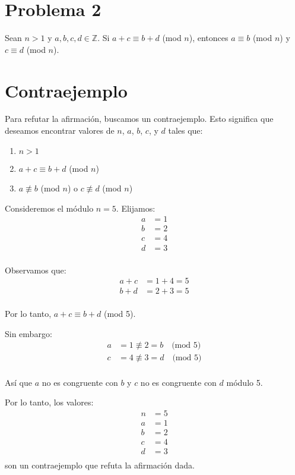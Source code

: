 \documentclass{article}
\begin{document}
\section*{Problema 2}
Sean \( n > 1 \) y \( a, b, c, d \in \mathbb{Z} \). Si \( a+c \equiv b+d \) (mod \( n \)), entonces \( a \equiv b \) (mod \( n \)) y \( c \equiv d \) (mod \( n \)).

\section*{Contraejemplo}

Para refutar la afirmación, buscamos un contraejemplo. Esto significa que deseamos encontrar valores de \( n \), \( a \), \( b \), \( c \), y \( d \) tales que:

\begin{enumerate}
    \item \( n > 1 \)
    \item \( a + c \equiv b + d \) (mod \( n \))
    \item \( a \not\equiv b \) (mod \( n \)) o \( c \not\equiv d \) (mod \( n \))
\end{enumerate}

Consideremos el módulo \( n = 5 \). Elijamos:
\[
\begin{aligned}
    a &= 1 \\
    b &= 2 \\
    c &= 4 \\
    d &= 3 \\
\end{aligned}
\]

Observamos que:
\[
\begin{aligned}
    a + c &= 1 + 4 = 5 \\
    b + d &= 2 + 3 = 5 \\
\end{aligned}
\]

Por lo tanto, \( a + c \equiv b + d \) (mod 5).

Sin embargo:
\[
\begin{aligned}
    a &= 1 \not\equiv 2 = b \quad \text{(mod 5)} \\
    c &= 4 \not\equiv 3 = d \quad \text{(mod 5)} \\
\end{aligned}
\]

Así que \( a \) no es congruente con \( b \) y \( c \) no es congruente con \( d \) módulo 5.

Por lo tanto, los valores:
\[
\begin{aligned}
    n &= 5 \\
    a &= 1 \\
    b &= 2 \\
    c &= 4 \\
    d &= 3 \\
\end{aligned}
\]
son un contraejemplo que refuta la afirmación dada.
\end{document}
